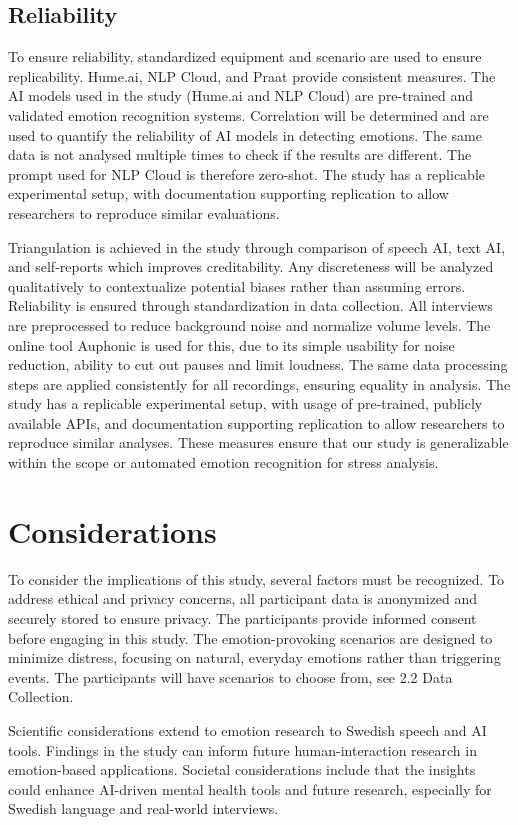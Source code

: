 \subsection{Reliability}
To ensure reliability, standardized equipment and scenario are used to ensure replicability. Hume.ai, NLP Cloud, and Praat provide consistent measures. The AI models used in the study (Hume.ai and NLP Cloud) are pre-trained and validated emotion recognition systems. Correlation will be determined and are used to quantify the reliability of AI models in detecting emotions. 
The same data is not analysed multiple times to check if the results are different. The prompt used for NLP Cloud is therefore zero-shot. 
The study has a replicable experimental setup, with documentation supporting replication to allow researchers to reproduce similar evaluations.  

Triangulation is achieved in the study through comparison of speech AI, text AI, and self-reports which improves creditability. Any discreteness will be analyzed qualitatively to contextualize potential biases rather than assuming errors. 
Reliability is ensured through standardization in data collection. All interviews are preprocessed to reduce background noise and normalize volume levels. The online tool Auphonic \autocite{Auphonic} is used for this, due to its simple usability for noise reduction, ability to cut out pauses and limit loudness. The same data processing steps are applied consistently for all recordings, ensuring equality in analysis. The study has a replicable experimental setup, with usage of pre-trained, publicly available APIs, and documentation supporting replication to allow researchers to reproduce similar analyses. These measures ensure that our study is generalizable within the scope or automated emotion recognition for stress analysis. 

\section{Considerations}
To consider the implications of this study, several factors must be recognized. To address ethical and privacy concerns, all participant data is anonymized and securely stored to ensure privacy. The participants provide informed consent before engaging in this study. The emotion-provoking scenarios are designed to minimize distress, focusing on natural, everyday emotions rather than triggering events. The participants will have scenarios to choose from, see 2.2 Data Collection. 

Scientific considerations extend to emotion research to Swedish speech and AI tools. Findings in the study can inform future human-interaction research in emotion-based applications. Societal considerations include that the insights could enhance AI-driven mental health tools and future research, especially for Swedish language and real-world interviews. 
